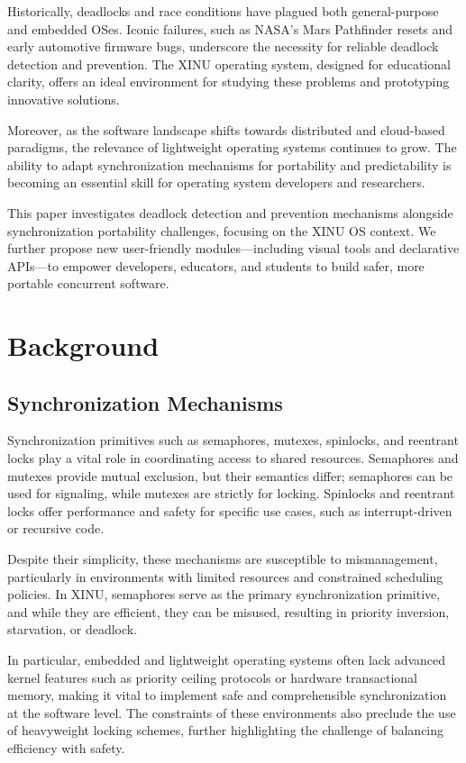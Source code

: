 \documentclass[conference,a4paper]{IEEEtran}
\begin{document}
Historically, deadlocks and race conditions have plagued both general-purpose and embedded OSes. Iconic failures, such as NASA’s Mars Pathfinder resets and early automotive firmware bugs, underscore the necessity for reliable deadlock detection and prevention. The XINU operating system, designed for educational clarity, offers an ideal environment for studying these problems and prototyping innovative solutions.

Moreover, as the software landscape shifts towards distributed and cloud-based paradigms, the relevance of lightweight operating systems continues to grow. The ability to adapt synchronization mechanisms for portability and predictability is becoming an essential skill for operating system developers and researchers.

This paper investigates deadlock detection and prevention mechanisms alongside synchronization portability challenges, focusing on the XINU OS context. We further propose new user-friendly modules—including visual tools and declarative APIs—to empower developers, educators, and students to build safer, more portable concurrent software.

\section{Background}

\subsection{Synchronization Mechanisms}

Synchronization primitives such as semaphores, mutexes, spinlocks, and reentrant locks play a vital role in coordinating access to shared resources. Semaphores and mutexes provide mutual exclusion, but their semantics differ; semaphores can be used for signaling, while mutexes are strictly for locking. Spinlocks and reentrant locks offer performance and safety for specific use cases, such as interrupt-driven or recursive code.

Despite their simplicity, these mechanisms are susceptible to mismanagement, particularly in environments with limited resources and constrained scheduling policies. In XINU, semaphores serve as the primary synchronization primitive, and while they are efficient, they can be misused, resulting in priority inversion, starvation, or deadlock.

In particular, embedded and lightweight operating systems often lack advanced kernel features such as priority ceiling protocols or hardware transactional memory, making it vital to implement safe and comprehensible synchronization at the software level. The constraints of these environments also preclude the use of heavyweight locking schemes, further highlighting the challenge of balancing efficiency with safety.
\end{document}
